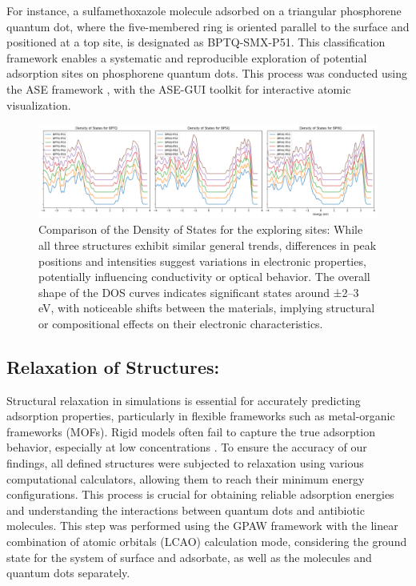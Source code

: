 \documentclass[preprint,12pt]{elsarticle}
\begin{document}
	For instance, a sulfamethoxazole molecule adsorbed on a triangular phosphorene quantum dot, where the five-membered ring is oriented parallel to the surface and positioned at a top site, is designated as BPTQ-SMX-P51. This classification framework enables a systematic and reproducible exploration of potential adsorption sites on phosphorene quantum dots. This process was conducted using the ASE framework \cite{HjorthLarsen2017}, with the ASE-GUI toolkit for interactive atomic visualization.
	
	\begin{center}
		\begin{figure}[H]
			
			\label{f:DosQD}
			\includegraphics[width=1\textwidth]{density_of_states.png}
			
			\caption{Comparison of the Density of States for the exploring sites: While all three structures exhibit similar general trends, differences in peak positions and intensities suggest variations in electronic properties, potentially influencing conductivity or optical behavior. The overall shape of the DOS curves indicates significant states around ±2–3 eV, with noticeable shifts between the materials, implying structural or compositional effects on their electronic characteristics.}
			\label{f:Dos_QD_ads}
		\end{figure}
		
	\end{center}
	
	
	\subsection{Relaxation of Structures:} Structural relaxation in simulations is essential for accurately predicting adsorption properties, particularly in flexible frameworks such as metal-organic frameworks (MOFs). Rigid models often fail to capture the true adsorption behavior, especially at low concentrations \cite{Yu2021Incorporating}. To ensure the accuracy of our findings, all defined structures were subjected to relaxation using various computational calculators, allowing them to reach their minimum energy configurations. This process is crucial for obtaining reliable adsorption energies and understanding the interactions between quantum dots and antibiotic molecules. This step was performed using the GPAW framework \cite{Mortensen2024} with the linear combination of atomic orbitals (LCAO) calculation mode, considering the ground state for the system of surface and adsorbate, as well as the molecules and quantum dots separately.
	
\end{document}
